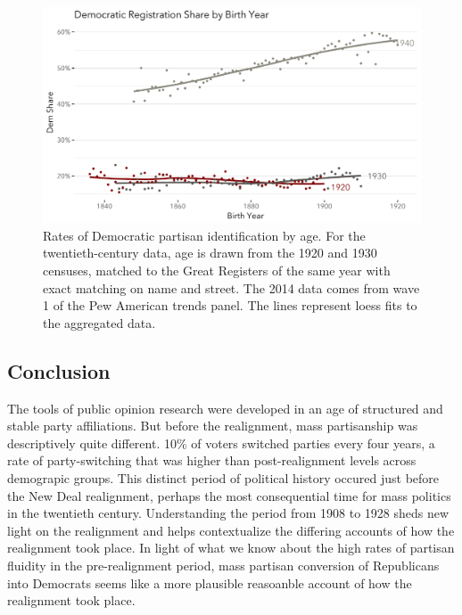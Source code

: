 \documentclass[11pt]{scrartcl}\usepackage[]{graphicx}\usepackage[]{color}
\makeatletter
\def\maxwidth{ %
  \ifdim\Gin@nat@width>\linewidth
    \linewidth
  \else
    \Gin@nat@width
  \fi
}
\newenvironment{knitrout}{}{} %
\makeatother
\begin{document}
\begin{knitrout}
\color{fgcolor}\begin{figure}

{\centering \includegraphics[width=\maxwidth]{figures/plots-age-1} 

}

\caption[Rates of Democratic partisan identification by age]{Rates of Democratic partisan identification by age. For the twentieth-century data, age is drawn from the 1920 and 1930 censuses, matched to the Great Registers of the same year with exact matching on name and street. The 2014 data comes from wave 1 of the Pew American trends panel. The lines represent loess fits to the aggregated data.}\label{fig:age}
\end{figure}


\end{knitrout}



\subsection*{Conclusion}

% 

The tools of public opinion research were developed in an age of structured and stable party affiliations. But before the realignment, mass partisanship was descriptively quite different. 10\% of voters switched parties every four years, a rate of party-switching that was higher than post-realignment levels across demograpic groups. This distinct period of political history occured just before the New Deal realignment, perhaps the most consequential time for mass politics in the twentieth century. Understanding the period from 1908 to 1928 sheds new light on the realignment and helps contextualize the differing accounts of how the realignment took place. In light of what we know about the high rates of partisan fluidity in the pre-realignment period, mass partisan conversion of Republicans into Democrats seems like a more plausible reasoanble account of how the realignment took place.
\end{document}
